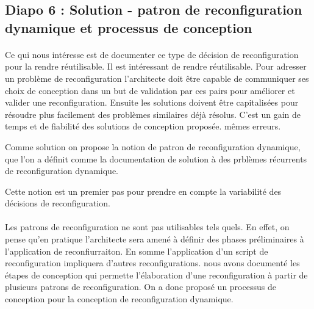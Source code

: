 \subsection{Diapo 6 : Solution - patron de reconfiguration dynamique
et processus de conception}

\paragraph{}
Ce qui nous intéresse est de documenter ce type de décision de
reconfiguration pour la rendre réutilisable. 
%
Il est intéressant de rendre réutilisable. 
Pour adresser un problème de reconfiguration l'architecte doit être
capable de communiquer ses choix de conception dans un but de
validation par ces pairs pour améliorer et valider une
reconfiguration. Ensuite les solutions doivent être capitalisées pour
résoudre plus facilement des problèmes similaires déjà résolus. C'est
un gain de temps et de fiabilité des solutions de conception proposée. 
mêmes erreurs. 

Comme solution on propose la notion de patron de
reconfiguration dynamique, que l'on a définit comme la documentation
de solution à des prblèmes récurrents de reconfiguration dynamique.

Cette notion est un premier pas pour prendre en compte la variabilité
des décisions de reconfiguration. 

\paragraph{}
Les patrons de reconfiguration ne sont pas utilisables tels quels.
En effet, on pense qu'en pratique l'architecte sera amené à définir
des phases préliminaires à l'application de reconfiurraiton. En somme
l'application d'un
script de reconfiguration impliquera d'autres reconfigurations. 
% 
nous avons documenté les étapes de conception qui permette
l'élaboration d'une reconfiguration à partir de plusieurs patrons de
reconfiguration. On a donc proposé un processus de conception pour la
conception de reconfiguration dynamique. 
 


